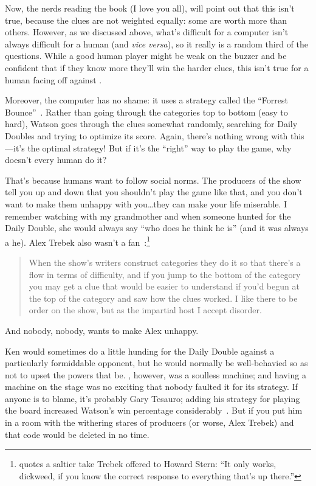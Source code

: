 Now, the \jeopardy{} nerds reading the book (I love you all), will
point out that this isn't true, because the clues are not weighted
equally: some are worth more than others.
%
However, as we discussed above, what's difficult for a computer isn't
always difficult for a human (and \textit{vice versa}), so it really
is a random third of the questions.
%
While a good human player might be weak on the buzzer and be confident
that if they know more they'll win the harder clues, this isn't true
for a human facing off against \watson{}.

Moreover, the computer has no shame: it uses a strategy called the
``Forrest Bounce''~\citep[more infamously associated with James Holzhauer
and Arthur Chu]{rogak-20}.
%
Rather than going through the categories top to bottom (easy to hard),
Watson goes through the clues somewhat randomly, searching for Daily
Doubles and trying to optimize its score.
%
Again, there's nothing wrong with this---it's the optimal strategy!
%
But if it's the ``right'' way to play the game, why doesn't every
human do it?

That's because humans want to follow social norms.
%
The producers of the show tell you up and
down that you shouldn't play the game like that, and you don't want to
make them unhappy with you\dots they can make your life miserable.
%
I remember watching \jeopardy{} with my grandmother and when someone
hunted for the Daily Double, she would always say ``who does he think
he is'' (and it was always a he).
%
Alex Trebek also wasn't a
fan~\citep{marchese-18}:\footnote{\citet{rogak-20} quotes a saltier
  take Trebek offered to Howard Stern: ``It only works, dickweed, if
  you know the correct response to everything that's up there.''}
%
\begin{quote}
  When the show's writers construct categories they do it so that
  there's a flow in terms of difficulty, and if you jump to the bottom
  of the category you may get a clue that would be easier to
  understand if you'd begun at the top of the category and saw how the
  clues worked. I like there to be order on the show, but as the
  impartial host I accept disorder.
\end{quote}
%
And nobody, nobody, wants to make Alex unhappy.

Ken would sometimes do a little hunding for the Daily Double against a
particularly formiddable opponent, but he would normally be
well-behavied so as not to upset the powers that be.
%
\watson{}, however, was a soulless machine; and having a machine on the
stage was no exciting that
nobody faulted it for its strategy.
%
If anyone is to blame, it's probably Gary Tesauro; adding his
strategy for playing the board increased Watson's win percentage
considerably~\citep{tesauro-13}.
%
But if you put him in a room with the withering stares of \jeopardy{}
producers (or worse, Alex Trebek) and that code would be deleted in no
time.

